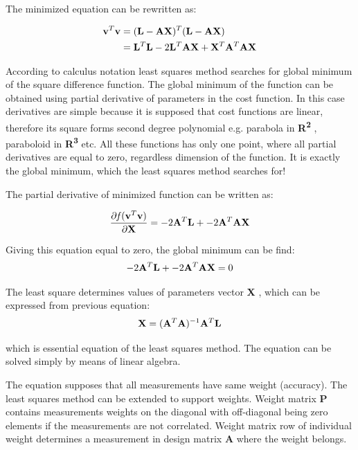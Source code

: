 \documentclass[a4paper,12pt]{article}
\newcommand{\ematr}[1]{
{\bf #1}
}
\newcommand{\evect}[1]{
{\bf #1}
}
\newcommand{\eucl}[1]{
{\bf R\textsuperscript{#1}}
}
\newcommand{\efunc}[1]{
{\it #1}
}
\begin{document}
The minimized equation can be rewritten as:

\begin{equation}
\begin{split}
\evect{v}^{T} \evect{v} &= (\evect{L} - \ematr{A}\ematr{X})^{T} (\evect{L} - \ematr{A}\ematr{X}) \\
&= \evect{L}^{T} \evect{L} - 2 \evect{L}^{T} \ematr{A} \evect{X} + \evect{X}^{T} \ematr{A}^{T} \ematr{A} \evect{X}
\label{eq:least_be_part}
\end{split}
\end{equation} 

According to calculus notation least squares method searches for global minimum of the square difference function. 
The global minimum of the function can be obtained using partial derivative of parameters in the cost function.
In this case derivatives are simple because it is supposed that cost functions are linear, therefore 
its square forms  second degree polynomial e.g. parabola in \eucl{2}, paraboloid in \eucl{3} etc. All these functions has
only one point, where all partial derivatives are equal to zero, regardless dimension of the function. It is 
exactly the global minimum, which the least squares method searches for!

The partial derivative of minimized function can be written as:
 
\begin{equation}
\frac{\partial \efunc{f} (\evect{v}^{T} \evect{v}) }{\partial \evect{X}} = -2\ematr{A}^{T} \evect{L} + -2\ematr{A}^{T}\ematr{A} \evect{X} 
\label{eq:least_part}
\end{equation} 

Giving this equation equal to zero, the global minimum can be find:
\begin{equation}
-2\ematr{A}^{T} \evect{L} + -2\ematr{A}^{T}\ematr{A} \evect{X} = 0 
\end{equation} 

The least square determines values of parameters vector \evect{X}, which can be expressed from previous equation:
\begin{equation}
\evect{X} = (\ematr{A}^{T} \ematr{A})^{-1} \ematr{A}^{T} \ematr{L}
\end{equation}

which is essential equation of the least squares method. The equation can be solved simply by means of linear algebra.

The equation supposes that all measurements have same weight (accuracy). The least squares method can be extended to support weights.
Weight matrix \ematr{P} contains measurements weights on the diagonal with off-diagonal being zero elements if
the measurements are not correlated.
Weight matrix row of individual weight determines a measurement in design matrix \ematr{A} where the weight belongs.
\end{document}
